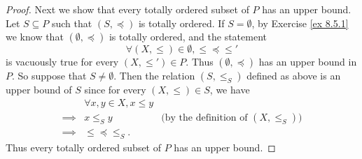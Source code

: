 \begin{proof}
    Next we show that every totally ordered subset of \(P\) has an upper bound.
    Let \(S \subseteq P\) such that \((S, \preceq)\) is totally ordered.
    If \(S = \emptyset\), by Exercise \ref{ex 8.5.1} we know that \((\emptyset, \preceq)\) is totally ordered, and the statement
    \[
        \forall (X, \leq) \in \emptyset, \leq \preceq \leq'
    \]
    is vacuously true for every \((X, \leq') \in P\).
    Thus \((\emptyset, \preceq)\) has an upper bound in \(P\).
    So suppose that \(S \neq \emptyset\).
    Then the relation \((S, \leq_S)\) defined as above is an upper bound of \(S\) since for every \((X, \leq) \in S\), we have
    \begin{align*}
                 & \forall x, y \in X, x \leq y                                                 \\
        \implies & x \leq_S y                   & \text{(by the definition of \((X, \leq_S)\))} \\
        \implies & \leq \preceq \leq_S.
    \end{align*}
    Thus every totally ordered subset of \(P\) has an upper bound.


\end{proof}
